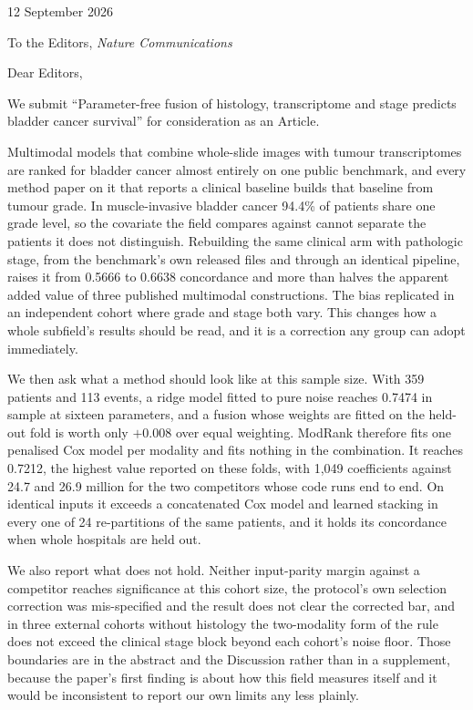 \documentclass[11pt]{article}
\begin{document}
\hfill 12 September 2026

To the Editors, \emph{Nature Communications}

Dear Editors,

We submit ``Parameter-free fusion of histology, transcriptome and stage predicts bladder cancer
survival'' for consideration as an Article.

Multimodal models that combine whole-slide images with tumour transcriptomes are ranked for bladder
cancer almost entirely on one public benchmark, and every method paper on it that reports a clinical
baseline builds that baseline from tumour grade. In muscle-invasive bladder cancer 94.4\% of patients
share one grade level, so the covariate the field compares against cannot separate the patients it
does not distinguish. Rebuilding the same clinical arm with pathologic stage, from the benchmark's own
released files and through an identical pipeline, raises it from 0.5666 to 0.6638 concordance and more
than halves the apparent added value of three published multimodal constructions. The bias replicated
in an independent cohort where grade and stage both vary. This changes how a whole subfield's results
should be read, and it is a correction any group can adopt immediately.

We then ask what a method should look like at this sample size. With 359 patients and 113 events,
a ridge model fitted to pure noise reaches 0.7474 in sample at sixteen parameters, and a fusion
whose weights are fitted on the held-out fold is worth only $+0.008$ over equal weighting. ModRank
therefore fits one penalised Cox model per modality and fits nothing in the combination. It reaches
0.7212, the highest value reported on these folds, with 1,049 coefficients against 24.7 and 26.9
million for the two competitors whose code runs end to end. On identical inputs it exceeds a
concatenated Cox model and learned stacking in every one of 24 re-partitions of the same patients,
and it holds its concordance when whole hospitals are held out.

We also report what does not hold. Neither input-parity margin against a competitor reaches
significance at this cohort size, the protocol's own selection correction was mis-specified and the
result does not clear the corrected bar, and in three external cohorts without histology the
two-modality form of the rule does not exceed the clinical stage block beyond each cohort's noise
floor. Those boundaries are in the abstract and the Discussion rather than in a supplement, because
the paper's first finding is about how this field measures itself and it would be inconsistent to
report our own limits any less plainly.
\end{document}

